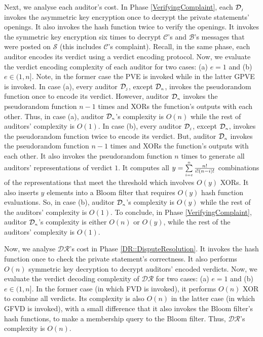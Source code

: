 Next, we analyse each auditor's cost. In Phase \ref{VerifyingComplaint}, each $\mathcal{D}_{\scriptscriptstyle j}$ invokes the asymmetric key encryption once to decrypt the private statements' openings. It also invokes the hash function twice to verify the openings. It invokes the symmetric key encryption six times to decrypt $\mathcal{C}$'s and $\mathcal{B}$'s messages that were posted on $\mathcal{S}$ (this includes $\mathcal{C}$'s complaint). Recall, in the same phase, each auditor encodes its verdict using a verdict encoding protocol. Now, we evaluate the verdict encoding complexity of each auditor for two cases: (a)   $e=1$ and (b) $e\in(1, n]$. Note, in the former case the PVE is invoked while in the latter GPVE is invoked. In case (a), every auditor $\mathcal{D}_{\scriptscriptstyle j}$, except $\mathcal{D}_{\scriptscriptstyle n}$, invokes the pseudorandom function once to encode its verdict. However,  auditor $\mathcal{D}_{\scriptscriptstyle n}$ invokes the pseudorandom function $n-1$ times and XORs the function's outputs with each other. Thus, in  case (a), auditor $\mathcal{D}_{\scriptscriptstyle n}$'s complexity is $O(n)$ while the rest of auditors' complexity is $O(1)$.  In case (b), every auditor $\mathcal{D}_{\scriptscriptstyle j}$, except $\mathcal{D}_{\scriptscriptstyle n}$, invokes the pseudorandom function twice to encode its verdict.  But,  auditor $\mathcal{D}_{\scriptscriptstyle n}$ invokes the pseudorandom function $n-1$ times and XORs the function's outputs with each other. It also invokes the pseudorandom function $n$ times to generate all auditors' representations of verdict $1$. It computes all $y=\sum\limits_{\scriptscriptstyle i=e}^{\scriptscriptstyle n}\frac{n!}{i!(n- i)!}$ combinations of the representations that meet the threshold which involves $O(y)$ XORs. It also inserts $y$ elements into a Bloom filter that requires  $O(y)$ hash function evaluations. So, in case (b), auditor $\mathcal{D}_{\scriptscriptstyle n}$'s complexity is $O(y)$ while the rest of the auditors' complexity is $O(1)$. To conclude, in Phase \ref{VerifyingComplaint},  auditor $\mathcal{D}_{\scriptscriptstyle n}$'s complexity is either $O(n)$ or $O(y)$, while the rest of  the auditors' complexity is $O(1)$. 

Now, we analyse $\mathcal{DR}$'s cost in Phase \ref{DR::DisputeResolution}. It invokes the hash function once to check the private statement's correctness. It also performs $O(n)$ symmetric key decryption to decrypt auditors' encoded verdicts. Now, we evaluate the verdict decoding complexity of $\mathcal{DR}$ 
for two cases: (a) $e = 1$ and (b) $e \in (1, n]$. In the former case (in which  FVD is invoked), it performs $O(n)$ XOR to combine all verdicts. Its complexity is also $O(n)$ in the latter case (in which  GFVD is invoked), with a small difference that it also invokes the Bloom filter's hash functions, to make a membership query to the Bloom filter.  Thus, $\mathcal{DR}$'s complexity is $O(n)$. 

